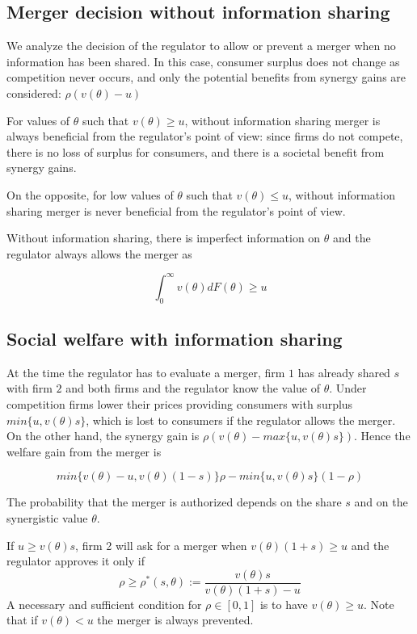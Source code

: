 \documentclass[a4paper,leqno]{article}%
\renewcommand{\t}{\theta}
\begin{document}
\subsection{Merger decision without information sharing}

We analyze the decision of the regulator to allow or prevent a merger when no information has been shared. In this case, consumer surplus does not change as competition never occurs, and only the potential benefits from synergy gains are considered: $\rho (v(\t)-u)$

For values of $\t$ such that $v(\t)\geq u$, without information sharing merger is always beneficial from the regulator's point of view: since firms do not compete, there is no loss of surplus for consumers, and there is a societal benefit from synergy gains.

On the opposite, for low values of $\t$ such that $v(\t)\leq u$, without information sharing merger is never beneficial from the regulator's point of view.

Without information sharing, there is imperfect information on $\t$ and the regulator always allows the merger as 

\[
\int_{0}^{\infty}v(\t)dF(\t)\geq u
\]

\medskip

\subsection{Social welfare with information sharing}

\medskip

At the time the regulator has to evaluate a merger, firm $1$ has already shared $s$ with firm $2$ and both firms and the regulator know the value of $\t$. Under competition firms lower their prices providing consumers with surplus $min\{u,v(\t)s\}$, which is lost to consumers if the regulator allows the merger. On the other hand, the synergy gain is $\rho (v(\t)-max\{u,v(\t)s\})$. Hence the welfare gain from the merger is

\[
min\{v(\t)-u,v(\t)(1-s)\}\rho-min\{u,v(\t)s\}(1-\rho)
\]




The probability that the merger is authorized depends on the share $s$ and on the synergistic value $\t$. 

If $u\geq v(\t)s$, firm 2 will ask for a merger when $v(\t)(1+s)\geq u$ and the regulator approves it only if  
    \begin{equation}
           \rho\geq \rho^*(s,\t):=\frac{v(\t)s}{v(\t)(1+s)-u}
    \end{equation}
A necessary and sufficient condition for $\rho\in[0,1]$ is to have $v(\t)\geq u$. Note that if $v(\t)<u$ the merger is always prevented.
\end{document}
